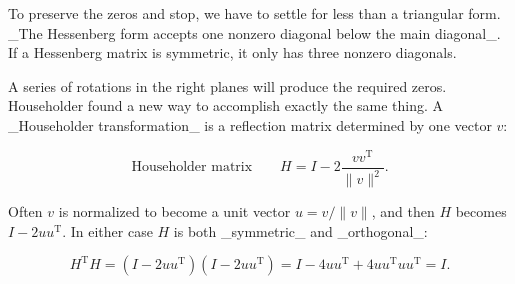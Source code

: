 To preserve the zeros and stop, we have to settle for less than a triangular form. _The Hessenberg form accepts one nonzero diagonal below the main diagonal_. If a Hessenberg matrix is symmetric, it only has three nonzero diagonals.

A series of rotations in the right planes will produce the required zeros. Householder found a new way to accomplish exactly the same thing. A _Householder transformation_ is a reflection matrix determined by one vector \(v\):

\[\text{Householder matrix}\qquad H=I-2\frac{vv^{\text{T}}}{\|v\|^{2}}.\]

Often \(v\) is normalized to become a unit vector \(u=v/\|v\|\), and then \(H\) becomes \(I-2uu^{\text{T}}\). In either case \(H\) is both _symmetric_ and _orthogonal_:

\[H^{\text{T}}H=(I-2uu^{\text{T}})(I-2uu^{\text{T}})=I-4uu^{\text{T}}+4uu^{ \text{T}}uu^{\text{T}}=I.\] 